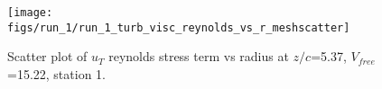 \begin{figure}[H]
\centering
\texttt{[image: figs/run\_1/run\_1\_turb\_visc\_reynolds\_vs\_r\_meshscatter]}
\caption{Scatter plot of $
u_T$ reynolds stress term vs radius at $z/c$=5.37, $V_{free}$=15.22, station 1.}
\label{fig:run_1_turb_visc_reynolds_vs_r_meshscatter}
\end{figure}


